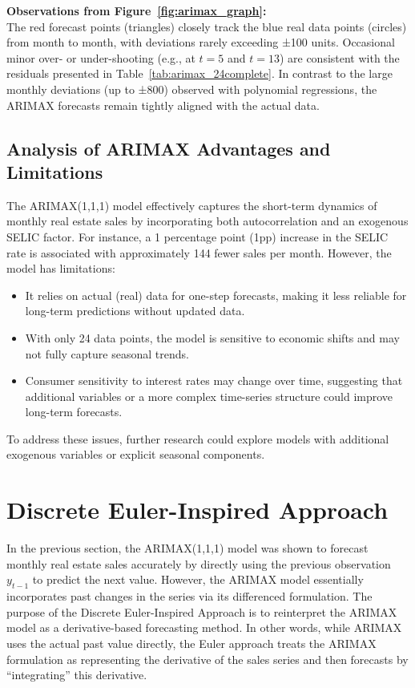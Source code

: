 \documentclass{article}
\begin{document}
\textbf{Observations from Figure~\ref{fig:arimax_graph}:}\\
The red forecast points (triangles) closely track the blue real data points (circles) from month to month, with deviations rarely exceeding ±100 units. Occasional minor over- or under-shooting (e.g., at \(t=5\) and \(t=13\)) are consistent with the residuals presented in Table~\ref{tab:arimax_24complete}. In contrast to the large monthly deviations (up to ±800) observed with polynomial regressions, the ARIMAX forecasts remain tightly aligned with the actual data.

\subsection{Analysis of ARIMAX Advantages and Limitations}
The ARIMAX(1,1,1) model effectively captures the short-term dynamics of monthly real estate sales by incorporating both autocorrelation and an exogenous SELIC factor. For instance, a 1 percentage point (1pp) increase in the SELIC rate is associated with approximately 144 fewer sales per month. However, the model has limitations:
\begin{itemize}
    \item It relies on actual (real) data for one-step forecasts, making it less reliable for long-term predictions without updated data.
    \item With only 24 data points, the model is sensitive to economic shifts and may not fully capture seasonal trends.
    \item Consumer sensitivity to interest rates may change over time, suggesting that additional variables or a more complex time-series structure could improve long-term forecasts.
\end{itemize}
To address these issues, further research could explore models with additional exogenous variables or explicit seasonal components.



\section{Discrete Euler-Inspired Approach}
\label{sec:euler}

In the previous section, the ARIMAX(1,1,1) model was shown to forecast monthly real estate sales accurately by directly using the previous observation \(y_{t-1}\) to predict the next value. However, the ARIMAX model essentially incorporates past changes in the series via its differenced formulation. The purpose of the Discrete Euler-Inspired Approach is to reinterpret the ARIMAX model as a derivative-based forecasting method. In other words, while ARIMAX uses the actual past value directly, the Euler approach treats the ARIMAX formulation as representing the derivative of the sales series and then forecasts by “integrating” this derivative.
\end{document}
